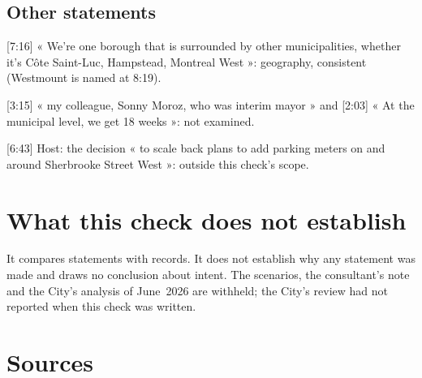 \documentclass[11pt,letterpaper]{article}
\newcommand{\cliptime}[1]{\textsf{\small[#1]}}
\begin{document}
\subsection{Other statements}

\cliptime{7:16} « We're one borough that is surrounded by other
municipalities, whether it's Côte Saint-Luc, Hampstead, Montreal West »:
geography, consistent (Westmount is named at 8:19).

\cliptime{3:15} « my colleague, Sonny Moroz, who was interim mayor » and
\cliptime{2:03} « At the municipal level, we get 18 weeks »: not examined.

\cliptime{6:43} Host: the decision « to scale back plans to add parking
meters on and around Sherbrooke Street West »: outside this check's scope.

\section{What this check does not establish}

It compares statements with records. It does not establish why any statement
was made and draws no conclusion about intent. The scenarios, the
consultant's note and the City's analysis of June~2026 are withheld; the
City's review had not reported when this check was written.

\section{Sources}
\end{document}
